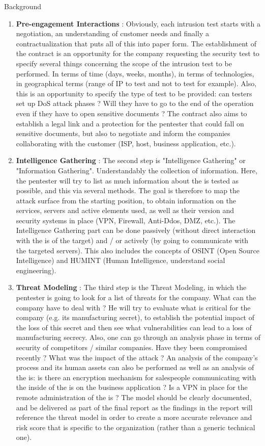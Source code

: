 \begin{chaptercover}{Background}
\begin{enumerate}
  \item \textbf{Pre-engagement Interactions} : Obviously, each intrusion test starts with a negotiation, an understanding of customer needs and finally a contractualization that puts all of this into paper form. The establishment of the contract is an opportunity for the company requesting the security test to specify several things concerning the scope of the intrusion test to be performed. In terms of time (days, weeks, months), in terms of technologies, in geographical terms (range of IP to test and not to test for example). Also, this is an opportunity to specify the type of test to be provided: can testers set up DoS attack phases ? Will they have to go to the end of the operation even if they have to open sensitive documents ? The contract also aims to establish a legal link and a protection for the pentester that could fall on sensitive documents, but also to negotiate and inform the companies collaborating with the customer (ISP, host, business application, etc.).
  \item \textbf{Intelligence Gathering} : The second step is "Intelligence Gathering" or "Information Gathering". Understandably the collection of information. Here, the pentester will try to list as much information about the \acrshort{is} tested as possible, and this via several methods. The goal is therefore to map the attack surface from the starting position, to obtain information on the services, servers and active elements used, as well as their version and security systems in place (VPN, Firewall, Anti-Ddos, DMZ, etc.). The Intelligence Gathering part can be done passively (without direct interaction with the \acrshort{is} of the target) and / or actively (by going to communicate with the targeted servers). This also includes the concepts of OSINT (Open Source Intelligence) and HUMINT (Human Intelligence, understand social engineering).
  \item \textbf{Threat Modeling} : The third step is the Threat Modeling, in which the pentester is going to look for a list of threats for the company. What can the company have to deal with ? He will try to evaluate what is critical for the company (e.g. its manufacturing secret), to establish the potential impact of the loss of this secret and then see what vulnerabilities can lead to a loss of manufacturing secrecy. Also, one can go through an analysis phase in terms of security of competitors / similar companies. Have they been compromised recently ? What was the impact of the attack ? An analysis of the company's process and its human assets can also be performed as well as an analysis of the \acrshort{is}: is there an encryption mechanism for salespeople communicating with the inside of the \acrshort{is} on the business application ? Is a VPN in place for the remote administration of the \acrshort{is} ? The model should be clearly documented, and be delivered as part of the final report as the findings in the report will reference the threat model in order to create a more accurate relevance and risk score that is specific to the organization (rather than a generic technical one).

\end{enumerate}
\end{chaptercover}
